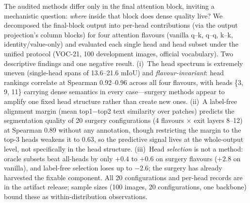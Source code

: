 \documentclass[11pt]{article}
\newcommand{\miou}{mIoU}
\begin{document}
The audited methods differ only in the final attention block, inviting a
mechanistic question: \emph{where} inside that block does dense quality live? We
decomposed the final-block output into per-head contributions (via the output
projection's column blocks) for four attention flavours (vanilla q--k, q--q, k--k,
identity/value-only) and evaluated each single head and head subset under the
unified protocol (VOC-21, 100 development images, official vocabulary). Two
descriptive findings and one negative result. (i)~The head spectrum is extremely
uneven (single-head spans of 13.6--21.6 \miou{}) and \emph{flavour-invariant}: head
rankings correlate at Spearman 0.92--0.96 across all four flavours, with heads
\{3, 9, 11\} carrying dense semantics in every case---surgery methods appear to
amplify one fixed head structure rather than create new ones. (ii)~A label-free
alignment margin (mean top1$-$top2 text similarity over patches) predicts the
segmentation quality of 20 surgery configurations (4 flavours $\times$ exit layers
8--12) at Spearman 0.89 without any annotation, though restricting the margin to the
top-3 heads weakens it to 0.63, so the predictive signal lives at the whole-output
level, not specifically in the head structure. (iii)~Head \emph{selection} is not a
method: oracle subsets beat all-heads by only $+0.4$ to $+0.6$ on surgery flavours
($+2.8$ on vanilla), and label-free selection loses up to $-2.6$; the surgery has
already harvested the fixable component. All 20 configurations and per-head records
are in the artifact release; sample sizes (100 images, 20 configurations, one
backbone) bound these as within-distribution observations.
\end{document}
